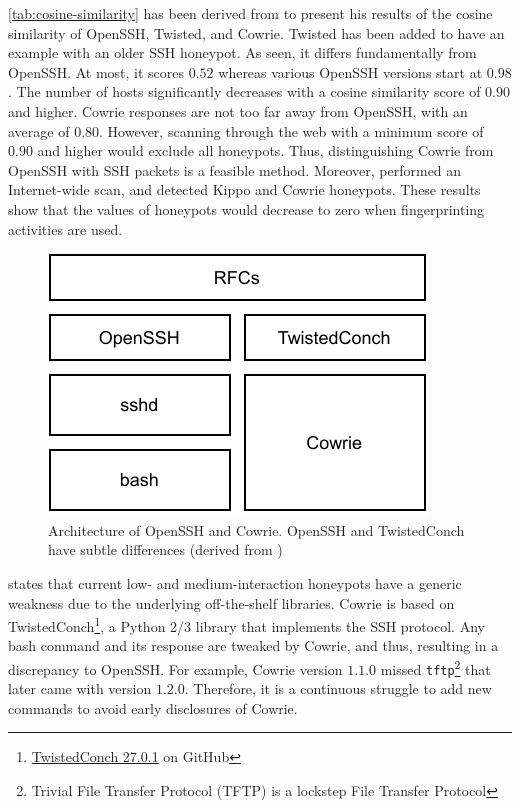 \autoref{tab:cosine-similarity} has been derived from \citet{vetterl2020} to present his results of the cosine similarity of OpenSSH, Twisted, and Cowrie.
Twisted has been added to have an example with an older SSH honeypot.
As seen, it differs fundamentally from OpenSSH.
At most, it scores $0.52$ whereas various OpenSSH versions start at $0.98$.
The number of hosts significantly decreases with a cosine similarity score of $0.90$ and higher.
Cowrie responses are not too far away from OpenSSH, with an average of $0.80$.
However, scanning through the web with a minimum score of $0.90$ and higher would exclude all honeypots.
Thus, distinguishing Cowrie from OpenSSH with SSH packets is a feasible method.
Moreover, \citet{vetterl2020} performed an Internet-wide scan, and detected  Kippo and  Cowrie honeypots.
These results show that the values of honeypots would decrease to zero when fingerprinting activities are used.

\begin{figure}[ht]
    \centering
    \includegraphics{figures/cowrie-openssh.pdf}
    \caption[Architecture of OpenSSH and Cowrie]{
        Architecture of OpenSSH and Cowrie.
        OpenSSH and TwistedConch have subtle differences (derived from \cite{vetterl2020})
    }
    \label{fig:cowrie-openssh}
\end{figure}

\citet{vetterl2020} states that current low- and medium-interaction honeypots have a generic weakness due to the underlying off-the-shelf libraries.
Cowrie is based on TwistedConch\footnote{\href{https://github.com/twisted/twisted/commit/4e3b22afe1f76b360733b65d6b835b7aaae6deb6}{TwistedConch 27.0.1} on GitHub}, a Python 2/3 library that implements the SSH protocol.
Any bash command and its response are tweaked by Cowrie, and thus, resulting in a discrepancy to OpenSSH.
For example, Cowrie version $1.1.0$ missed \verb|tftp|\footnote{Trivial File Transfer Protocol (TFTP) is a lockstep File Transfer Protocol} that later came with version $1.2.0$.
Therefore, it is a continuous struggle to add new commands to avoid early disclosures of Cowrie.

